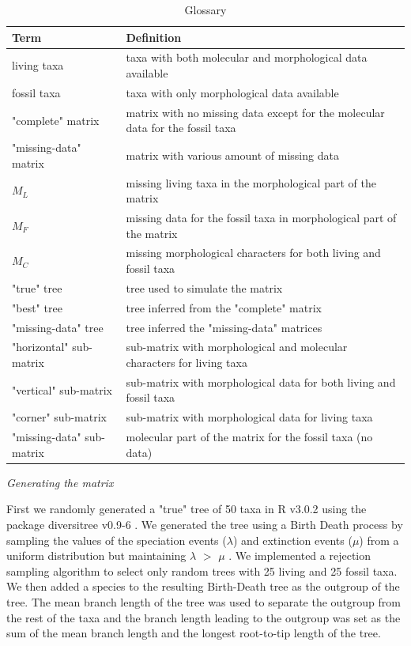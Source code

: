 \documentclass[12pt,letterpaper]{article}
\renewcommand{\subsection}[1]{%
\bigskip
\begin{center}
\begin{large}
\normalfont\itshape #1
\end{large}
\end{center}}
\begin{document}
\begin{table}[ht]
\caption{Glossary}
\centering
\begin{tabular}{p{5cm} p{9cm}}
\hline
\hfill Term & Definition \\[0.5ex]
\hline
\hfill living taxa & taxa with both molecular and morphological data available \\[1.5ex]
\hfill fossil taxa & taxa with only morphological data available \\[1.5ex]
\hfill "complete" matrix & matrix with no missing data except for the molecular data for the fossil taxa \\[1.5ex]
\hfill "missing-data" matrix & matrix with various amount of missing data \\[1.5ex]
\hfill $M_{L}$ & missing living taxa in the morphological part of the matrix \\[1.5ex]
\hfill $M_{F}$ & missing data for the fossil taxa in morphological part of the matrix \\[1.5ex]
\hfill $M_{C}$ & missing morphological characters for both living and fossil taxa \\[1.5ex]
\hfill "true" tree & tree used to simulate the matrix \\[1.5ex]
\hfill "best" tree & tree inferred from the "complete" matrix \\[1.5ex]
\hfill "missing-data" tree & tree inferred the "missing-data" matrices \\[1.5ex]
\hfill "horizontal" sub-matrix & sub-matrix with morphological and molecular characters for living taxa \\[1.5ex]
\hfill "vertical" sub-matrix & sub-matrix with morphological data for both living and fossil taxa \\[1.5ex]
\hfill "corner" sub-matrix & sub-matrix with morphological data for living taxa \\[1.5ex]
\hfill "missing-data" sub-matrix & molecular part of the matrix for the fossil taxa (no data) \\
\end{tabular}
\label{Tab_glossary}
\end{table}

\subsection{Generating the matrix}
First we randomly generated a "true" tree of 50 taxa in R v3.0.2 \citep{R302} using the package diversitree v0.9-6 \citep{fitzjohndiversitree2012}.
We generated the tree using a Birth Death process by sampling the values of the speciation events ($\lambda$) and extinction events ($\mu$) from a uniform distribution but maintaining $\lambda$ $>$ $\mu$ \citep{paradistime-dependent2011}.
We implemented a rejection sampling algorithm to select only random trees with 25 living and 25 fossil taxa.
We then added a species to the resulting Birth-Death tree as the outgroup of the tree.
The mean branch length of the tree was used to separate the outgroup from the rest of the taxa and the branch length leading to the outgroup was set as the sum of the mean branch length and the longest root-to-tip length of the tree.
\end{document}
